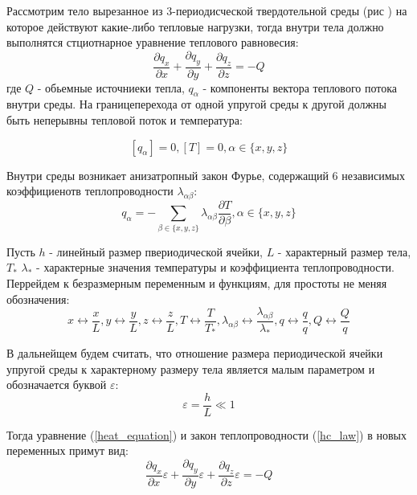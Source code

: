 Рассмотрим тело вырезанное из 3-периодисческой твердотельной среды (рис ) на которое действуют какие-либо тепловые нагрузки, тогда внутри тела должно выполнятся
стциотнарное уравнение теплового равновесия:
\begin{equation}
    \label{heat_equation}
    \frac{\partial q_x}{\partial x} + \frac{\partial q_y}{\partial y} + \frac{\partial q_z}{\partial z} = -Q
\end{equation}
где 
$Q$
- обьемные источниеки тепла, 
$q_\alpha$ 
- компоненты вектора теплового потока внутри среды.
На границеперехода от одной упругой среды к другой должны быть неперывны тепловой поток и температура:

\begin{equation}
    \label{hc_eq2}
    \left[ q_\alpha \right] = 0, \left[ T \right] = 0, \alpha \in \{ x,y,z \}
\end{equation}

Внутри среды возникает анизатропный закон Фурье, содержащий 6 независимых коэффициенотв теплопроводности 
$\lambda_{\alpha \beta}$:
\begin{equation}
    \label{hc_law}
    q_{\alpha} = - \sum_{\beta \in \{x,y,z\}}\lambda_{\alpha \beta}\frac{\partial T}{\partial \beta}, \alpha \in \{x,y,z\}
\end{equation}

Пусть 
$h$
- линейный размер пвериодической ячейки, 
$L$
- характерный размер тела, 
$T_{\ast}$ $\lambda_{\ast}$ 
- характерные значения температуры и коэффициента 
теплопроводности. Перрейдем к безразмерным переменным и функциям, для простоты не меняя обозначения:
\begin{equation}
x \leftrightarrow \frac{x}{L}, 
y \leftrightarrow \frac{y}{L}, 
z \leftrightarrow \frac{z}{L},
T \leftrightarrow \frac{T}{T_{\ast}},
\lambda_{\alpha \beta} \leftrightarrow \frac{\lambda_{\alpha \beta}}{\lambda_{\ast}},
q \leftrightarrow \frac{q}{q},
Q \leftrightarrow \frac{Q}{q}
\end{equation}

В дальнейщем будем считать, что отношение размера периодической ячейки упругой среды к характерному размеру тела является малым 
параметром и обозначается буквой 
$\varepsilon$:
\begin{equation}
    \varepsilon = \frac{h}{L} \ll 1
\end{equation}

Тогда уравнение 
(\ref{heat_equation}) 
и закон теплопроводности 
(\ref{hc_law}) 
в новых переменных примут вид:
\begin{equation}
    \frac{\partial q_x}{\partial x}\varepsilon + \frac{\partial q_y}{\partial y}\varepsilon + \frac{\partial q_z}{\partial z}\varepsilon = -Q
\end{equation}

